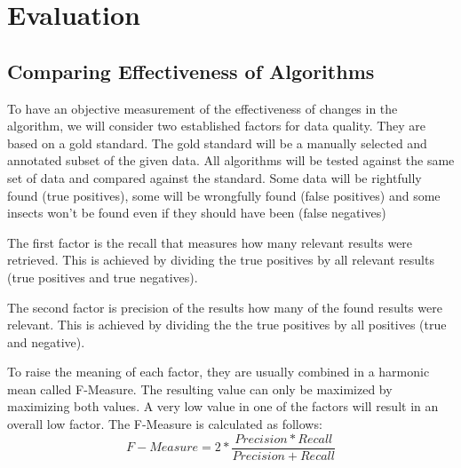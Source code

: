 %
\section{Evaluation}
\label{sec_eval}

\subsection{Comparing Effectiveness of Algorithms}
To have an objective measurement of the effectiveness of changes in the algorithm, we will consider two established factors for data quality. 
They are based on a gold standard. 
The gold standard will be a manually selected and annotated subset of the given data. 
All algorithms will be tested against the same set of data and compared against the standard.
Some data will be rightfully found (true positives), some will be wrongfully found (false positives) and some insects won't be found even if they should have been (false negatives)

The first factor is the recall that measures how many relevant results were retrieved. 
This is achieved by dividing the true positives by all relevant results (true positives and true negatives).

The second factor is precision of the results how many of the found results were relevant. 
This is achieved by dividing the the true positives by all positives (true and negative).

To raise the meaning of each factor, they are usually combined in a harmonic mean called F-Measure. 
The resulting value can only be maximized by maximizing both values. 
A very low value in one of the factors will result in an overall low factor. 
The F-Measure is calculated as follows: 
\[
F-Measure = 2*\frac{Precision*Recall}{Precision+Recall}
\]
